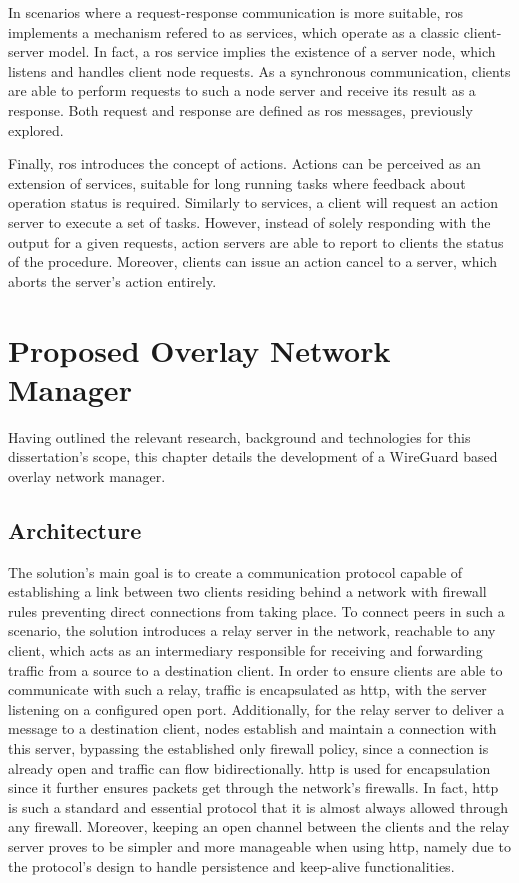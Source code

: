 \documentclass[11pt,twoside,a4paper]{report}
\begin{document}
In scenarios where a request-response communication is more suitable, \ac{ros} implements a mechanism refered to as services, which operate as a classic client-server model. In fact, a \ac{ros} service implies the existence of a server node, which listens and handles client node requests. As a synchronous communication, clients are able to perform requests to such a node server and receive its result as a response. Both request and response are defined as \ac{ros} messages, previously explored.

Finally, \ac{ros} introduces the concept of actions. Actions can be perceived as an extension of services, suitable for long running tasks where feedback about operation status is required. Similarly to services, a client will request an action server to execute a set of tasks. However, instead of solely responding with the output for a given requests, action servers are able to report to clients the status of the procedure. Moreover, clients can issue an action cancel to a server, which aborts the server's action entirely.

\chapter{Proposed Overlay Network Manager}

Having outlined the relevant research, background and technologies for this dissertation's scope, this chapter details the development of a WireGuard based overlay network manager.

\section{Architecture}

The solution's main goal is to create a communication protocol capable of establishing a link between two clients residing behind a network with firewall rules preventing direct connections from taking place. To connect peers in such a scenario, the solution introduces a relay server in the network, reachable to any client, which acts as an intermediary responsible for receiving and forwarding traffic from a source to a destination client. In order to ensure clients are able to communicate with such a relay, traffic is encapsulated as \ac{http}, with the server listening on a configured open port. Additionally, for the relay server to deliver a message to a destination client, nodes establish and maintain a connection with this server, bypassing the established only firewall policy, since a connection is already open and traffic can flow bidirectionally. \ac{http} is used for encapsulation since it further ensures packets get through the network's firewalls. In fact, \ac{http} is such a standard and essential protocol that it is almost always allowed through any firewall. Moreover, keeping an open channel between the clients and the relay server proves to be simpler and more manageable when using \ac{http}, namely due to the protocol's design to handle persistence and keep-alive functionalities.
\end{document}
